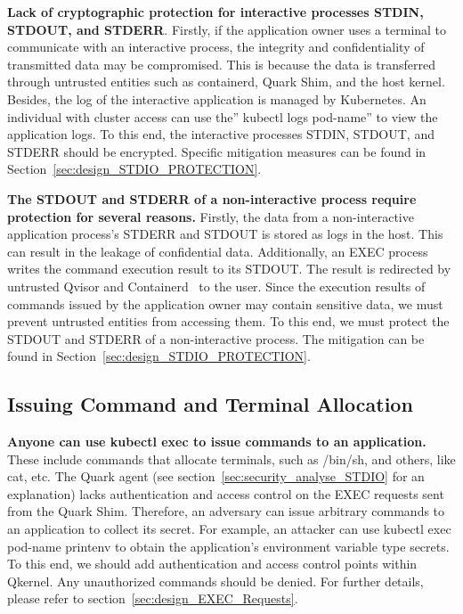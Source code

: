 \textbf{Lack of cryptographic protection for interactive processes STDIN, STDOUT, and STDERR}. Firstly, if the application owner uses a terminal to communicate with an interactive process, the integrity and confidentiality of transmitted data may be compromised.  
This is because the data is transferred through untrusted entities such as containerd, Quark Shim, and the host kernel. Besides, the log of the interactive application is managed by Kubernetes. An individual with cluster access can use the” kubectl logs pod-name” to view the application logs. To this end, the interactive processes STDIN, STDOUT, and 
STDERR should be encrypted. Specific mitigation measures can be found in Section~\ref{sec:design_STDIO_PROTECTION}.
 
 
\textbf{The STDOUT and STDERR of a non-interactive process require protection for several reasons.} Firstly, the data from a non-interactive application process’s STDERR and STDOUT is stored as logs in the host. This can result in the leakage of confidential data. Additionally, an EXEC process writes the command execution result to its STDOUT. The result is 
redirected by untrusted Qvisor and Containerd~\cite*{containerd} to the user. Since the execution results of commands issued by the application owner may contain sensitive data, we must prevent untrusted entities from accessing them. To this end, we must protect the STDOUT and STDERR of a non-interactive process. The mitigation can be found in 
Section~\ref{sec:design_STDIO_PROTECTION}.


\subsection{Issuing Command and Terminal Allocation}
\textbf{Anyone can use kubectl exec to issue commands to an application.} These include commands that allocate terminals, such as /bin/sh, and others, like cat, etc. The Quark agent (see section~\ref{sec:security_analyse_STDIO} for an explanation) lacks authentication and access control on the EXEC requests sent from the Quark Shim. Therefore, an adversary can 
issue arbitrary commands to an application to collect its secret. For example, an attacker can use kubectl exec pod-name printenv to obtain the application’s environment variable type secrets. To this end, we should add authentication and access control points within Qkernel. Any unauthorized commands should be denied. For further details, please refer to 
section~\ref{sec:design_EXEC_Requests}.



